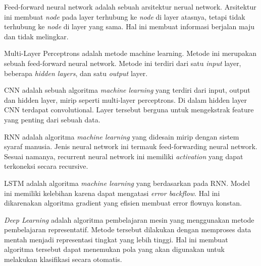 \documentclass[12pt, a4paper, twoside]{article}
\begin{document}
Feed-forward neural network adalah sebuah arsitektur nerual network. Arsitektur ini membuat \textit{node} pada layer terhubung ke \textit{node} di layer atasnya, tetapi tidak terhubung ke \textit{node} di layer yang sama. Hal ini membuat informasi berjalan maju dan tidak melingkar. \cite{Schmidt.1992}

Multi-Layer Perceptrons adalah metode machine learning. Metode ini merupakan sebuah feed-forward neural network. Metode ini terdiri dari satu \textit{input} layer, beberapa \textit{hidden layers}, dan satu \textit{output} layer. \cite{Riedmiller.1994}

CNN adalah sebuah algoritma \textit{machine learning} yang terdiri dari input, output dan hidden layer, mirip seperti multi-layer perceptrons. Di dalam hidden layer CNN terdapat convolutional. Layer tersebut berguna untuk mengekstrak feature yang penting dari sebuah data. \cite{Valueva.2020}

RNN adalah algoritma \textit{machine learning} yang didesain mirip dengan sistem syaraf manusia. Jenis neural network ini termauk feed-forwarding neural network. Sesuai namanya, recurrent neural network ini memiliki \textit{activation} yang dapat terkoneksi secara recursive. \cite{Lukosevicius.2009}

LSTM adalah algoritma \textit{machine learning} yang berdasarkan pada RNN. Model ini memiliki kelebihan karena dapat mengatasi \textit{error backflow}. Hal ini dikarenakan algoritma gradient yang efisien membuat error flownya konstan. \cite{Hochreiter.1997}

\textit{Deep Learning} adalah algoritma pembelajaran mesin yang menggunakan metode pembelajaran representatif. Metode tersebut dilakukan dengan memproses data mentah menjadi representasi tingkat yang lebih tinggi. Hal ini membuat algoritma tersebut dapat menemukan pola yang akan digunakan untuk melakukan klasifikasi secara otomatis. \cite{LeCun.2015}

\printbibliography[title = Daftar Pustaka]
\end{document}
